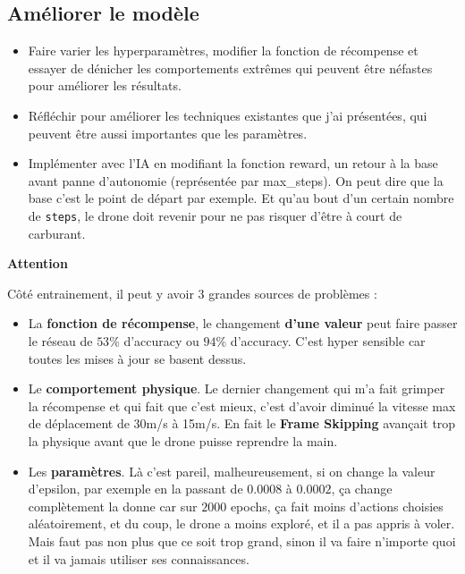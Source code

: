 \documentclass{article}
\begin{document}
\subsection{Améliorer le modèle}

\begin{itemize}
    \item Faire varier les hyperparamètres, modifier la fonction de récompense et essayer de dénicher les comportements extrêmes qui peuvent être néfastes pour améliorer les résultats. 
    \item Réfléchir pour améliorer les techniques existantes que j'ai présentées, qui peuvent être aussi importantes que les paramètres.
    \item Implémenter avec l'IA en modifiant la fonction reward, un retour à la base avant panne d'autonomie (représentée par max\_steps).
    On peut dire que la base c'est le point de départ par exemple. Et qu'au bout d'un certain nombre de \texttt{steps}, le drone doit revenir
    pour ne pas risquer d'être à court de carburant.
\end{itemize}

\vspace{0.5cm}

\textbf{Attention}

Côté entrainement, il peut y avoir 3 grandes sources de problèmes :
\begin{itemize}
    \item La \textbf{fonction de récompense}, le changement \textbf{d'une valeur} peut faire passer le réseau de $53$\% d'accuracy ou $94$\% d'accuracy.
    C'est hyper sensible car toutes les mises à jour se basent dessus.
    \item Le \textbf{comportement physique}.  Le dernier changement qui m'a fait grimper la récompense et qui fait que c'est mieux, c'est d'avoir diminué la vitesse max de déplacement 
    de 30m/s à 15m/s. En fait le \textbf{Frame Skipping} avançait trop la physique avant que le drone puisse reprendre la main.
    \item Les \textbf{paramètres}. Là c'est pareil, malheureusement, si on change la valeur d'epsilon, par exemple en la passant de $0.0008$ à $0.0002$,
    ça change complètement la donne car sur $2000$ epochs, ça fait moins d'actions choisies aléatoirement, et du coup, le drone a moins exploré, et il a pas appris à voler.
    Mais faut pas non plus que ce soit trop grand, sinon il va faire n'importe quoi et il va jamais utiliser ses connaissances.
\end{itemize}
\end{document}
